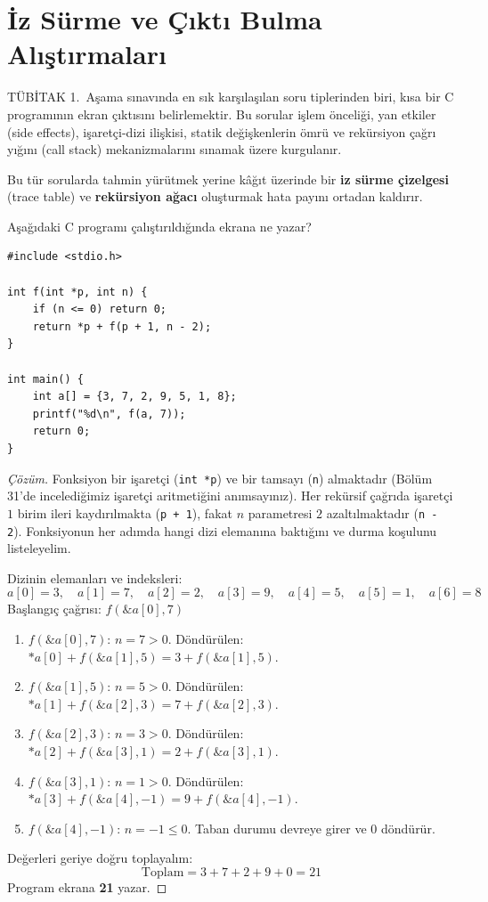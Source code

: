 \section{İz Sürme ve Çıktı Bulma Alıştırmaları}

TÜBİTAK 1.~Aşama sınavında en sık karşılaşılan soru tiplerinden biri, kısa bir C programının ekran çıktısını belirlemektir. Bu sorular işlem önceliği, yan etkiler (side effects), işaretçi-dizi ilişkisi, statik değişkenlerin ömrü ve rekürsiyon çağrı yığını (call stack) mekanizmalarını sınamak üzere kurgulanır.

Bu tür sorularda tahmin yürütmek yerine kâğıt üzerinde bir \textbf{iz sürme çizelgesi} (trace table) ve \textbf{rekürsiyon ağacı} oluşturmak hata payını ortadan kaldırır.

\begin{example}
Aşağıdaki C programı çalıştırıldığında ekrana ne yazar?

\begin{lstlisting}[language=CTemel]
#include <stdio.h>

int f(int *p, int n) {
    if (n <= 0) return 0;
    return *p + f(p + 1, n - 2);
}

int main() {
    int a[] = {3, 7, 2, 9, 5, 1, 8};
    printf("%d\n", f(a, 7));
    return 0;
}
\end{lstlisting}
\end{example}

\begin{proof}[Çözüm]
Fonksiyon bir işaretçi (\texttt{int *p}) ve bir tamsayı (\texttt{n}) almaktadır (Bölüm 31'de incelediğimiz işaretçi aritmetiğini anımsayınız). Her rekürsif çağrıda işaretçi $1$ birim ileri kaydırılmakta (\texttt{p + 1}), fakat $n$ parametresi $2$ azaltılmaktadır (\texttt{n - 2}). Fonksiyonun her adımda hangi dizi elemanına baktığını ve durma koşulunu listeleyelim.

Dizinin elemanları ve indeksleri:
\[
a[0]=3, \quad a[1]=7, \quad a[2]=2, \quad a[3]=9, \quad a[4]=5, \quad a[5]=1, \quad a[6]=8
\]
Başlangıç çağrısı: $f(\&a[0], 7)$
\begin{enumerate}
    \item $f(\&a[0], 7)$: $n = 7 > 0$. Döndürülen: $*a[0] + f(\&a[1], 5) = 3 + f(\&a[1], 5)$.
    \item $f(\&a[1], 5)$: $n = 5 > 0$. Döndürülen: $*a[1] + f(\&a[2], 3) = 7 + f(\&a[2], 3)$.
    \item $f(\&a[2], 3)$: $n = 3 > 0$. Döndürülen: $*a[2] + f(\&a[3], 1) = 2 + f(\&a[3], 1)$.
    \item $f(\&a[3], 1)$: $n = 1 > 0$. Döndürülen: $*a[3] + f(\&a[4], -1) = 9 + f(\&a[4], -1)$.
    \item $f(\&a[4], -1)$: $n = -1 \le 0$. Taban durumu devreye girer ve $0$ döndürür.
\end{enumerate}

Değerleri geriye doğru toplayalım:
\[
\text{Toplam} = 3 + 7 + 2 + 9 + 0 = 21
\]
Program ekrana \textbf{21} yazar.
\end{proof}

